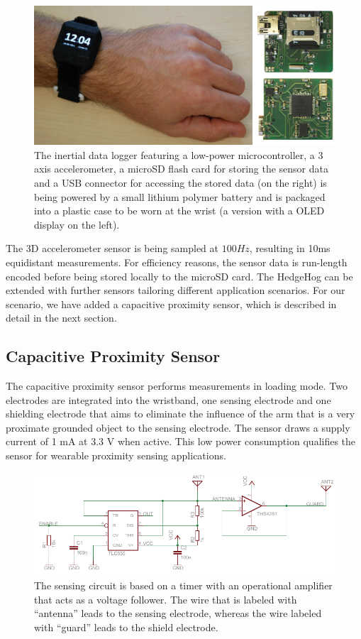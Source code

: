 \documentclass[runningheads,a4paper]{llncs}
\begin{document}
\begin{figure}
	\centering
	\includegraphics[width=\textwidth]{Images/hardware_sensor_2.jpg}
	\caption{The inertial data logger featuring a low-power microcontroller, a 3 axis accelerometer, a microSD flash card for storing the sensor data and a USB connector for accessing the stored data (on the right) is being powered by a small lithium polymer battery and is packaged into a plastic case to be worn at the wrist (a version with a OLED display on the left).}
	\label{fig:sensornode}
\end{figure}

The 3D accelerometer sensor is being sampled at $100Hz$, resulting in 10ms equidistant measurements. For efficiency reasons, the sensor data is run-length encoded before being stored locally to the microSD card. The HedgeHog can be extended with further sensors tailoring different application scenarios. For our scenario, we have added a capacitive proximity sensor, which is described in detail in the next section.

\subsection{Capacitive Proximity Sensor}

The capacitive proximity sensor performs measurements in loading mode. Two electrodes are integrated into the wristband, one sensing electrode and one shielding electrode that aims to eliminate the influence of the arm that is a very proximate grounded object to the sensing electrode. The sensor draws a supply current of 1 mA at 3.3 V when active. This low power consumption qualifies the sensor for wearable proximity sensing applications. 

\begin{figure}
	\centering
		\includegraphics[width=1.00\textwidth]{Images/schematic.pdf}
	\caption{The sensing circuit is based on a timer with an operational amplifier that acts as a voltage follower. The wire that is labeled with ``antenna'' leads to the sensing electrode, whereas the wire labeled with ``guard'' leads to the shield electrode.}
	\label{fig:schematic}
\end{figure}
\end{document}

